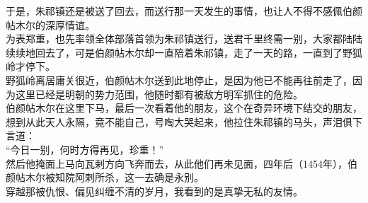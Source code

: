 \begin{multicols}{\theparacolNo}
于是，朱祁镇还是被送了回去，而送行那一天发生的事情，也让人不得不感佩伯颜帖木尔的深厚情谊。\\

为表郑重，也先率领全体部落首领为朱祁镇送行，送君千里终需一别，大家都陆陆续续地回去了，可是伯颜帖木尔却一直陪着朱祁镇，走了一天的路，一直到了野狐岭才停下。\\

野狐岭离居庸关很近，伯颜帖木尔送到此地停止，是因为他已不能再往前走了，因为这里已经是明朝的势力范围，他随时都有被敌方明军抓住的危险。\\

伯颜帖木尔在这里下马，最后一次看着他的朋友，这个在奇异环境下结交的朋友，想到从此天人永隔，竟不能自己，号啕大哭起来，他拉住朱祁镇的马头，声泪俱下言道：\\

“今日一别，何时方得再见，珍重！”\\

然后他掩面上马向瓦剌方向飞奔而去，从此他们再未见面，四年后（1454年），伯颜帖木尔被知院阿剌所杀，这一去确是永别。\\

穿越那被仇恨、偏见纠缠不清的岁月，我看到的是真挚无私的友情。\\
\ifnum{}
	\end{multicols}
\fi
\newpage
